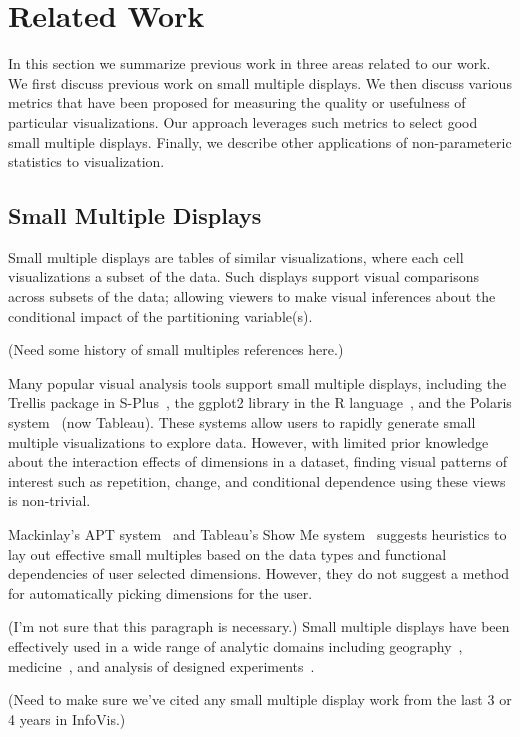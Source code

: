 \section{Related Work}
\label{sec:related}
In this section we summarize previous work in three areas related to our work. We first discuss previous work on small multiple displays. We then discuss various metrics that have been proposed for measuring the quality or usefulness of particular visualizations. Our approach leverages such metrics to select good small multiple displays. Finally, we describe other applications of non-parameteric statistics to visualization.

\subsection{Small Multiple Displays}
Small multiple displays are tables of similar visualizations, where each cell visualizations a subset of the data. Such displays support visual comparisons across subsets of the data; allowing viewers to make visual inferences about the conditional impact of the partitioning variable(s).

(Need some history of small multiples references here.)

Many popular visual analysis tools support small multiple displays, including the Trellis package in S-Plus~\cite{}, the ggplot2 library in the R language~\cite{Wickham2006}, and the Polaris system~\cite{Stolte2002} (now Tableau). These systems allow users to rapidly generate small multiple visualizations to explore data. However, with limited prior knowledge about the interaction effects of dimensions in a dataset, finding visual patterns of interest such as repetition, change, and conditional dependence using these views is non-trivial.

Mackinlay's APT system~\cite{} and Tableau's Show Me system~\cite{mackinlay2007} suggests heuristics to lay out effective small multiples based on the data types and functional dependencies of user selected dimensions. However, they do not suggest a method for automatically picking dimensions for the user. 

(I'm not sure that this paragraph is necessary.)
Small multiple displays have been effectively used in a wide range of analytic domains including geography~\cite{Guo2006, Maceachren2003}, medicine~\cite{Lunzer2010, Sarni2005}, and analysis of designed experiments~\cite{Fuentes2011}.

(Need to make sure we've cited any small multiple display work from the last 3 or 4 years in InfoVis.)

